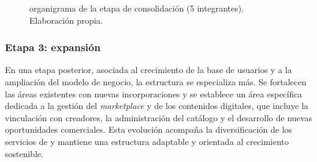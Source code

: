 \begin{figure}[htbp]
\centering
{}
\caption{organigrama de la etapa de consolidación (5 integrantes). Elaboración propia.}
\end{figure}

\subsubsection{Etapa 3: expansión}
En una etapa posterior, asociada al crecimiento de la base de usuarios y a la ampliación del modelo de negocio, la estructura se especializa más. Se fortalecen las áreas existentes con nuevas incorporaciones y se establece un área específica dedicada a la gestión del \textit{marketplace} y de los contenidos digitales, que incluye la vinculación con creadores, la administración del catálogo y el desarrollo de nuevas oportunidades comerciales. Esta evolución acompaña la diversificación de los servicios de \nombreproyecto{} y mantiene una estructura adaptable y orientada al crecimiento sostenible.

